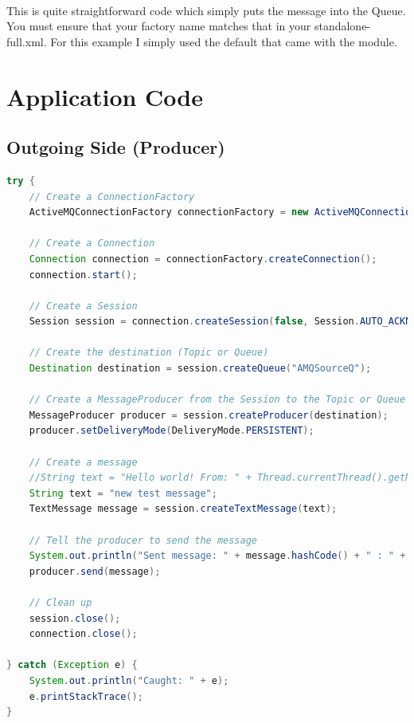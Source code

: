 \documentclass[
10pt, %
letterpaper, %
oneside, %
headinclude,footinclude, %
BCOR5mm, %
]{scrartcl}
\begin{document}
\paragraph{}
This is quite straightforward code which simply puts the message into the Queue. You must ensure that your factory name matches that in your standalone-full.xml. For this example I simply used the default that came with the module.



\section{Application Code}


\subsection{\textbf{Outgoing Side (Producer)}}


\begin{lstlisting}[language=Java]
try {
	// Create a ConnectionFactory
	ActiveMQConnectionFactory connectionFactory = new ActiveMQConnectionFactory("tcp://opmq1.outsmartinc.com:61616");

	// Create a Connection
	Connection connection = connectionFactory.createConnection();
	connection.start();

	// Create a Session
	Session session = connection.createSession(false, Session.AUTO_ACKNOWLEDGE);

	// Create the destination (Topic or Queue)
	Destination destination = session.createQueue("AMQSourceQ");

	// Create a MessageProducer from the Session to the Topic or Queue
	MessageProducer producer = session.createProducer(destination);
	producer.setDeliveryMode(DeliveryMode.PERSISTENT);

	// Create a message
	//String text = "Hello world! From: " + Thread.currentThread().getName() + " : " + this.hashCode();
	String text = "new test message";
	TextMessage message = session.createTextMessage(text);

	// Tell the producer to send the message
	System.out.println("Sent message: " + message.hashCode() + " : " + Thread.currentThread().getName());
	producer.send(message);

	// Clean up
	session.close();
	connection.close();
	
} catch (Exception e) {
	System.out.println("Caught: " + e);
	e.printStackTrace();
}
\end{lstlisting}
\end{document}
